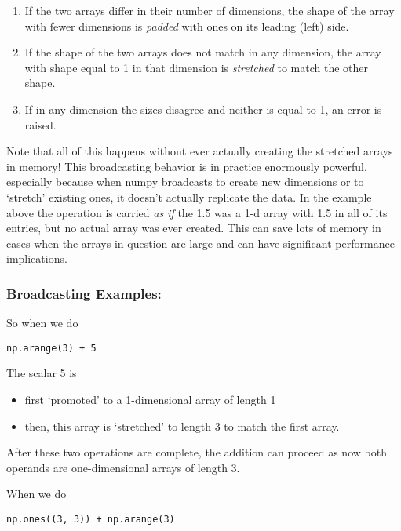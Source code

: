 \documentclass{article}
\begin{document}
\begin{enumerate}
\def\labelenumi{\arabic{enumi}.}
\item
  If the two arrays differ in their number of dimensions, the shape of
  the array with fewer dimensions is \emph{padded} with ones on its
  leading (left) side.
\item
  If the shape of the two arrays does not match in any dimension, the
  array with shape equal to 1 in that dimension is \emph{stretched} to
  match the other shape.
\item
  If in any dimension the sizes disagree and neither is equal to 1, an
  error is raised.
\end{enumerate}

Note that all of this happens without ever actually creating the
stretched arrays in memory! This broadcasting behavior is in practice
enormously powerful, especially because when numpy broadcasts to create
new dimensions or to `stretch' existing ones, it doesn't actually
replicate the data. In the example above the operation is carried
\emph{as if} the 1.5 was a 1-d array with 1.5 in all of its entries, but
no actual array was ever created. This can save lots of memory in cases
when the arrays in question are large and can have significant
performance implications.

    \subsubsection{Broadcasting Examples:}

So when we do

\begin{verbatim}
np.arange(3) + 5
\end{verbatim}

The scalar 5 is

\begin{itemize}
\itemsep1pt\parskip0pt
\item
  first `promoted' to a 1-dimensional array of length 1
\item
  then, this array is `stretched' to length 3 to match the first array.
\end{itemize}

After these two operations are complete, the addition can proceed as now
both operands are one-dimensional arrays of length 3.

    When we do

\begin{verbatim}
np.ones((3, 3)) + np.arange(3)
\end{verbatim}
\end{document}
